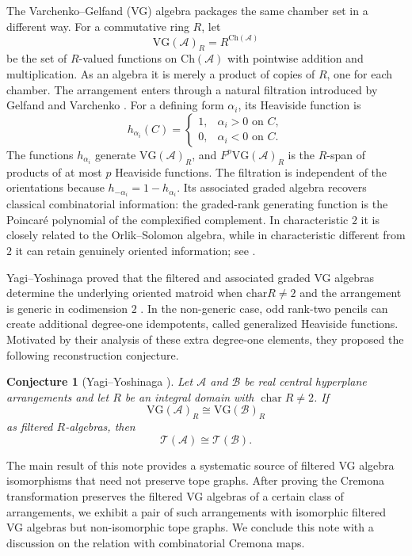\documentclass{amsart}
\numberwithin{equation}{section}
\newtheorem{conj}[thm]{Conjecture}
\theoremstyle{plain}
\theoremstyle{remark}
\theoremstyle{definition}
\numberwithin{equation}{section}
\newcommand{\A}{\mathcal{A}}
\newcommand{\B}{\mathcal{B}}
\newcommand{\T}{\mathcal{T}}
\newcommand{\Ch}{\mathrm{Ch}}
\newcommand{\VG}{\mathrm{VG}}
\begin{document}
The Varchenko--Gelfand (VG) algebra packages the same chamber set in a different way.  For a commutative ring $R$, let
\[
\VG(\A)_R=R^{\Ch(\A)}
\]
be the set of $R$-valued functions on $\Ch(\A)$ with pointwise addition and multiplication.  As an algebra it is merely a product of copies of $R$, one for each chamber.  The arrangement enters through a natural filtration introduced by Gelfand and Varchenko \cite{Gelfand1987}.  For a defining form $\alpha_i$, its Heaviside function is
\[
h_{\alpha_i}(C)=
\begin{cases}
1,&\alpha_i>0\text{ on }C,\\
0,&\alpha_i<0\text{ on }C.
\end{cases}
\]
The functions $h_{\alpha_i}$ generate $\VG(\A)_R$, and $F^p\VG(\A)_R$ is the $R$-span of products of at most $p$ Heaviside functions.  The filtration is independent of the orientations because $h_{-\alpha_i}=1-h_{\alpha_i}$.  Its associated graded algebra recovers classical combinatorial information: the graded-rank generating function is the Poincar\'e polynomial of the complexified complement.  In characteristic $2$ it is closely related to the Orlik--Solomon algebra, while in characteristic different from $2$ it can retain genuinely oriented information; see \cite{Gelfand1987,Yagi2026}.

Yagi--Yoshinaga proved that the filtered and associated graded VG algebras determine the underlying oriented matroid when $\mathrm{char}R\neq 2$ and the arrangement is generic in codimension $2$ \cite[Theorems~3.6 and~5.3]{Yagi2026}.  In the non-generic case, odd rank-two pencils can create additional degree-one idempotents, called generalized Heaviside functions.  Motivated by their analysis of these extra degree-one elements, they proposed the following reconstruction conjecture.

\begin{conj}[Yagi--Yoshinaga \cite{Yagi2026}]\label{YY}
Let $\A$ and $\B$ be real central hyperplane arrangements and let $R$ be an integral domain with $\operatorname{char}R\neq2$.  If
\[
\VG(\A)_R\cong \VG(\B)_R
\]
as filtered $R$-algebras, then
\[
\T(\A)\cong\T(\B).
\]
\end{conj}

The main result of this note provides a systematic source of filtered VG algebra isomorphisms that need not preserve tope graphs. After proving the Cremona transformation preserves the filtered VG algebras of a certain class of arrangements, we exhibit a pair of such arrangements with isomorphic filtered VG algebras but non-isomorphic tope graphs. We conclude this note with a discussion on the relation with combinatorial Cremona maps.
\end{document}
